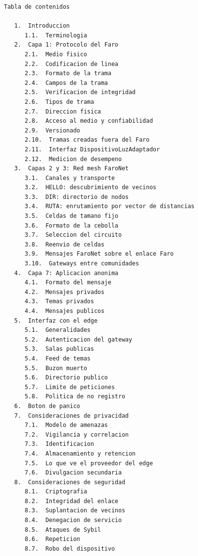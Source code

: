 \begin{Verbatim}
Tabla de contenidos

   1.  Introduccion
      1.1.  Terminologia
   2.  Capa 1: Protocolo del Faro
      2.1.  Medio fisico
      2.2.  Codificacion de linea
      2.3.  Formato de la trama
      2.4.  Campos de la trama
      2.5.  Verificacion de integridad
      2.6.  Tipos de trama
      2.7.  Direccion fisica
      2.8.  Acceso al medio y confiabilidad
      2.9.  Versionado
      2.10.  Tramas creadas fuera del Faro
      2.11.  Interfaz DispositivoLuzAdaptador
      2.12.  Medicion de desempeno
   3.  Capas 2 y 3: Red mesh FaroNet
      3.1.  Canales y transporte
      3.2.  HELLO: descubrimiento de vecinos
      3.3.  DIR: directorio de nodos
      3.4.  RUTA: enrutamiento por vector de distancias
      3.5.  Celdas de tamano fijo
      3.6.  Formato de la cebolla
      3.7.  Seleccion del circuito
      3.8.  Reenvio de celdas
      3.9.  Mensajes FaroNet sobre el enlace Faro
      3.10.  Gateways entre comunidades
   4.  Capa 7: Aplicacion anonima
      4.1.  Formato del mensaje
      4.2.  Mensajes privados
      4.3.  Temas privados
      4.4.  Mensajes publicos
   5.  Interfaz con el edge
      5.1.  Generalidades
      5.2.  Autenticacion del gateway
      5.3.  Salas publicas
      5.4.  Feed de temas
      5.5.  Buzon muerto
      5.6.  Directorio publico
      5.7.  Limite de peticiones
      5.8.  Politica de no registro
   6.  Boton de panico
   7.  Consideraciones de privacidad
      7.1.  Modelo de amenazas
      7.2.  Vigilancia y correlacion
      7.3.  Identificacion
      7.4.  Almacenamiento y retencion
      7.5.  Lo que ve el proveedor del edge
      7.6.  Divulgacion secundaria
   8.  Consideraciones de seguridad
      8.1.  Criptografia
      8.2.  Integridad del enlace
      8.3.  Suplantacion de vecinos
      8.4.  Denegacion de servicio
      8.5.  Ataques de Sybil
      8.6.  Repeticion
      8.7.  Robo del dispositivo
\end{Verbatim}
\newpage
